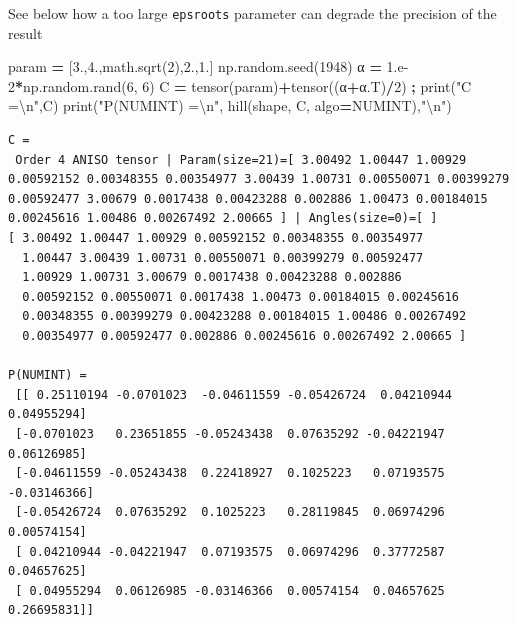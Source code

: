 \documentclass[
  a4paper,
  numbers=noendperiod,
  DIV=12]{scrreprt}
\newenvironment{Shaded}{\begin{snugshade}}{\end{snugshade}}
\newcommand{\BuiltInTok}[1]{#1}
\newcommand{\CharTok}[1]{\textcolor[rgb]{0.31,0.60,0.02}{#1}}
\newcommand{\DecValTok}[1]{\textcolor[rgb]{0.00,0.00,0.81}{#1}}
\newcommand{\FloatTok}[1]{\textcolor[rgb]{0.00,0.00,0.81}{#1}}
\newcommand{\NormalTok}[1]{#1}
\newcommand{\OperatorTok}[1]{\textcolor[rgb]{0.81,0.36,0.00}{\textbf{#1}}}
\newcommand{\StringTok}[1]{\textcolor[rgb]{0.31,0.60,0.02}{#1}}
\begin{document}
See below how a too large \texttt{epsroots} parameter can degrade the
precision of the result

\begin{Shaded}
\begin{Highlighting}[]
\NormalTok{param }\OperatorTok{=}\NormalTok{ [}\FloatTok{3.}\NormalTok{,}\FloatTok{4.}\NormalTok{,math.sqrt(}\DecValTok{2}\NormalTok{),}\FloatTok{2.}\NormalTok{,}\FloatTok{1.}\NormalTok{]}
\NormalTok{np.random.seed(}\DecValTok{1948}\NormalTok{)}
\NormalTok{α }\OperatorTok{=} \FloatTok{1.e{-}2}\OperatorTok{*}\NormalTok{np.random.rand(}\DecValTok{6}\NormalTok{, }\DecValTok{6}\NormalTok{)}
\NormalTok{C }\OperatorTok{=}\NormalTok{ tensor(param)}\OperatorTok{+}\NormalTok{tensor((α}\OperatorTok{+}\NormalTok{α.T)}\OperatorTok{/}\DecValTok{2}\NormalTok{) }\OperatorTok{;} \BuiltInTok{print}\NormalTok{(}\StringTok{"C =}\CharTok{\textbackslash{}n}\StringTok{"}\NormalTok{,C)}
\BuiltInTok{print}\NormalTok{(}\StringTok{"P(NUMINT) =}\CharTok{\textbackslash{}n}\StringTok{"}\NormalTok{, hill(shape, C, algo}\OperatorTok{=}\NormalTok{NUMINT),}\StringTok{"}\CharTok{\textbackslash{}n}\StringTok{"}\NormalTok{)}
\end{Highlighting}
\end{Shaded}

\begin{verbatim}
C =
 Order 4 ANISO tensor | Param(size=21)=[ 3.00492 1.00447 1.00929 0.00592152 0.00348355 0.00354977 3.00439 1.00731 0.00550071 0.00399279 0.00592477 3.00679 0.0017438 0.00423288 0.002886 1.00473 0.00184015 0.00245616 1.00486 0.00267492 2.00665 ] | Angles(size=0)=[ ]
[ 3.00492 1.00447 1.00929 0.00592152 0.00348355 0.00354977 
  1.00447 3.00439 1.00731 0.00550071 0.00399279 0.00592477 
  1.00929 1.00731 3.00679 0.0017438 0.00423288 0.002886 
  0.00592152 0.00550071 0.0017438 1.00473 0.00184015 0.00245616 
  0.00348355 0.00399279 0.00423288 0.00184015 1.00486 0.00267492 
  0.00354977 0.00592477 0.002886 0.00245616 0.00267492 2.00665 ]

P(NUMINT) =
 [[ 0.25110194 -0.0701023  -0.04611559 -0.05426724  0.04210944  0.04955294]
 [-0.0701023   0.23651855 -0.05243438  0.07635292 -0.04221947  0.06126985]
 [-0.04611559 -0.05243438  0.22418927  0.1025223   0.07193575 -0.03146366]
 [-0.05426724  0.07635292  0.1025223   0.28119845  0.06974296  0.00574154]
 [ 0.04210944 -0.04221947  0.07193575  0.06974296  0.37772587  0.04657625]
 [ 0.04955294  0.06126985 -0.03146366  0.00574154  0.04657625  0.26695831]] 
\end{verbatim}
\end{document}
